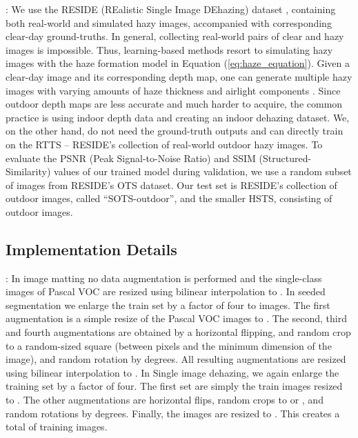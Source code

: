 \documentclass[journal]{IEEEtran}
\begin{document}
: We use the RESIDE (REalistic Single Image DEhazing) dataset \cite{reside}, containing both real-world and simulated hazy images, accompanied with corresponding clear-day ground-truths. In general, collecting real-world pairs of clear and hazy images is impossible. Thus, learning-based methods resort to simulating hazy images with the haze formation model in Equation (\ref{eq:haze_equation}). Given a clear-day image and its corresponding depth map, one can generate multiple hazy images with varying amounts of haze thickness  and airlight components . Since outdoor depth maps are less accurate and much harder to acquire, the common practice is using indoor depth data and creating an indoor dehazing dataset. We, on the other hand, do not need the ground-truth outputs and can directly train on the RTTS -- RESIDE's collection of  real-world outdoor hazy images. To evaluate the PSNR (Peak Signal-to-Noise Ratio) and SSIM (Structured-Similarity) values of our trained model during validation, we use a random subset of  images from RESIDE's OTS dataset. Our test set is RESIDE's collection of  outdoor images, called ``SOTS-outdoor'', and the smaller HSTS, consisting of  outdoor images.



\subsection{Implementation Details} \label{ss:implementation}

: In image matting no data augmentation is performed and the single-class images of Pascal VOC are resized using bilinear interpolation to . In seeded segmentation we enlarge the train set by a factor of four to  images. The first augmentation is a simple resize of the Pascal VOC images to . The second, third and fourth augmentations are obtained by a horizontal flipping, and random crop to a random-sized square (between  pixels and the minimum dimension of the image), and random rotation by  degrees. All resulting augmentations are resized using bilinear interpolation to .
In Single image dehazing, we again enlarge the training set by a factor of four. The first set are simply the train images resized to . The other augmentations are horizontal flips, random crops to  or , and random rotations by  degrees. Finally, the images are resized to . This creates a total of  training images.
\end{document}
